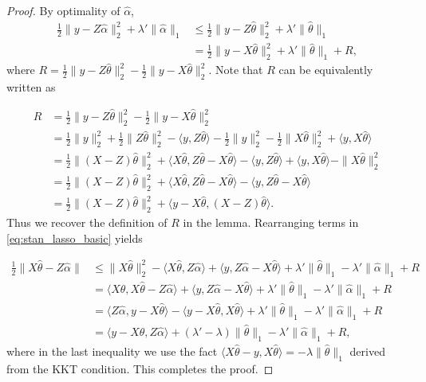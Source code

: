 \documentclass[a4paper]{article}
\begin{document}
\begin{proof}
By optimality of $\hat{\alpha}$,
\begin{equation}
\begin{aligned}
\frac{1}{2}\|y-Z\hat{\alpha}\|_2^2 + \lambda'\|\hat{\alpha}\|_1 &\leq \frac{1}{2}\|y-Z\hat{\theta}\|_2^2 + \lambda'\|\hat{\theta}\|_1\\
&= \frac{1}{2}\|y - X\hat{\theta}\|_2^2 + \lambda'\|\hat{\theta}\|_1 + R,
\label{eq:stan_lasso_basic}
\end{aligned}
\end{equation}
where $R = \frac{1}{2}\|y-Z\hat{\theta}\|_2^2 - \frac{1}{2}\|y-X\hat{\theta}\|_2^2$. Note that $R$ can be equivalently written as

\begin{align*}
R &= \frac{1}{2}\|y-Z\hat{\theta}\|_2^2 - \frac{1}{2}\|y-X\hat{\theta}\|_2^2\\
&= \frac{1}{2}\|y\|_2^2 + \frac{1}{2}\|Z\hat{\theta}\|_2^2 - \langle y, Z\hat{\theta}\rangle - \frac{1}{2}\|y\|_2^2 - \frac{1}{2}\|X\hat{\theta}\|_2^2 + \langle y, X\hat{\theta}\rangle\\
&= \frac{1}{2}\|(X-Z)\hat{\theta}\|_2^2 + \langle X\hat{\theta}, Z\hat{\theta}-X\hat{\theta}\rangle - \langle y, Z\hat{\theta}\rangle + \langle y, X\hat{\theta}\rangle - \|X\hat{\theta}\|_2^2\\
&= \frac{1}{2}\|(X-Z)\hat{\theta}\|_2^2 + \langle X\hat{\theta}, Z\hat{\theta}-X\hat{\theta}\rangle - \langle y, Z\hat{\theta}-X\hat{\theta}\rangle\\
&= \frac{1}{2}\|(X-Z)\hat{\theta}\|_2^2 + \langle y-X\hat{\theta}, (X-Z)\hat{\theta}\rangle.
\end{align*}
Thus we recover the definition of $R$ in the lemma. Rearranging terms in \eqref{eq:stan_lasso_basic} yields

\begin{align*}
\frac{1}{2}\|X\hat{\theta} - Z\hat{\alpha}\| &\leq \|X\hat{\theta}\|_2^2 - \langle X\hat{\theta}, Z\hat{\alpha}\rangle + \langle y, Z\hat{\alpha}-X\hat{\theta}\rangle + \lambda'\|\hat{\theta}\|_1 - \lambda'\|\hat{\alpha}\|_1 + R\\
&= \langle X\hat{\theta}, X\hat{\theta} - Z\hat{\alpha} \rangle + \langle y, Z\hat{\alpha} - X\hat{\theta}\rangle + \lambda'\|\hat{\theta}\|_1 - \lambda'\|\hat{\alpha}\|_1 + R\\
&= \langle Z\hat{\alpha}, y-X\hat{\theta}\rangle - \langle y-X\hat{\theta}, X\hat{\theta}\rangle + \lambda'\|\hat{\theta}\|_1 - \lambda'\|\hat{\alpha}\|_1 + R\\
&= \langle y-X\hat{\theta}, Z\hat{\alpha}\rangle + (\lambda'-\lambda)\|\hat{\theta}\|_1 - \lambda'\|\hat{\alpha}\|_1 + R,
\end{align*}
where in the last inequality we use the fact $\langle X\hat{\theta} - y, X\hat{\theta}\rangle = -\lambda\|\hat{\theta}\|_1$ derived from the KKT condition. This completes the proof.
\end{proof}
\end{document}
